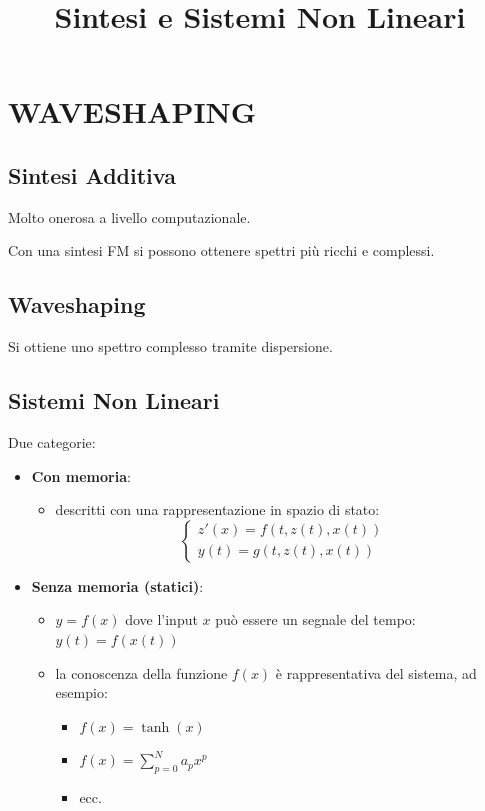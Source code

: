 
\chapter{WAVESHAPING}
\title{Sintesi e Sistemi Non Lineari}

\section{Sintesi Additiva}
Molto onerosa a livello computazionale.

Con una sintesi FM si possono ottenere spettri più ricchi e complessi.

\section*{Waveshaping}
Si ottiene uno spettro complesso tramite dispersione.

\section{Sistemi Non Lineari}

Due categorie:
\begin{itemize}
    \item \textbf{Con memoria}:
    \begin{itemize}
        \item descritti con una rappresentazione in spazio di stato:
        \[
        \begin{cases}
        z'(x) = f(t, z(t), x(t)) \\
        y(t) = g(t, z(t), x(t))
        \end{cases}
        \]
    \end{itemize}
    
    \item \textbf{Senza memoria (statici)}:
    \begin{itemize}
        \item $y = f(x)$ dove l’input $x$ può essere un segnale del tempo: $y(t) = f(x(t))$
        \item la conoscenza della funzione $f(x)$ è rappresentativa del sistema, ad esempio:
        \begin{itemize}
            \item $f(x) = \tanh(x)$
            \item $f(x) = \sum_{p=0}^{N} a_p x^p$
            \item ecc.
        \end{itemize}
    \end{itemize}
\end{itemize}

